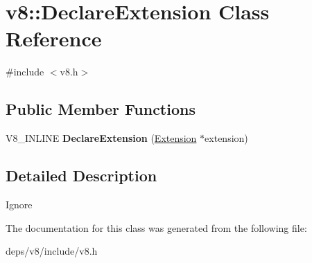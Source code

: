 \hypertarget{classv8_1_1_declare_extension}{}\section{v8\+:\+:Declare\+Extension Class Reference}
\label{classv8_1_1_declare_extension}


{\ttfamily \#include $<$v8.\+h$>$}

\subsection*{Public Member Functions}
\begin{DoxyCompactItemize}
\item 
\hypertarget{classv8_1_1_declare_extension_af3b52757ae0cf848e1cdc007c485d04d}{}V8\+\_\+\+I\+N\+L\+I\+N\+E {\bfseries Declare\+Extension} (\hyperlink{classv8_1_1_extension}{Extension} $\ast$extension)\label{classv8_1_1_declare_extension_af3b52757ae0cf848e1cdc007c485d04d}

\end{DoxyCompactItemize}


\subsection{Detailed Description}
Ignore 

The documentation for this class was generated from the following file\+:\begin{DoxyCompactItemize}
\item 
deps/v8/include/v8.\+h\end{DoxyCompactItemize}
